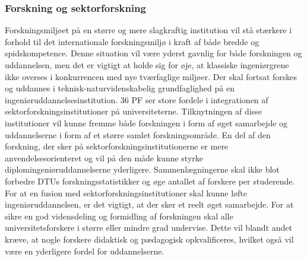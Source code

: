 \subsubsection{Forskning og sektorforskning}
Forskningsmiljøet på en større og mere slagkraftig institution vil stå stærkere i forhold til det internationale
forskningsmiljø i kraft af både bredde og spidskompetence. Denne situation vil være yderst gavnlig for både
forskningen og uddannelsen, men det er vigtigt at holde sig for øje, at klassiske ingeniørgrene ikke overses i
konkurrencen med nye tværfaglige miljøer. Der skal fortsat forskes og uddannes i teknisk-naturvidenskabelig
grundfaglighed på en ingeniøruddannelsesinstitution.
36
PF ser store fordele i integrationen af sektorforskningsinstitutioner på universiteterne. Tilknytningen af disse
institutioner vil kunne fremme både forskningen i form af øget samarbejde og uddannelserne i form af et større samlet
forskningsområde. En del af den forskning, der sker på sektorforskningsinstitutionerne er mere anvendelsesorienteret og
vil på den måde kunne styrke diplomingeniøruddannelserne yderligere.
Sammenlægningerne skal ikke blot forbedre DTUs forskningsstatistikker og øge antallet af forskere per studerende. For
at en fusion med sektorforskningsinstitutioner skal kunne løfte ingeniøruddannelsen, er det vigtigt, at der sker et reelt
øget samarbejde.
For at sikre en god vidensdeling og formidling af forskningen skal alle universitetsforskere i større eller mindre grad
undervise. Dette vil blandt andet kræve, at nogle forskere didaktisk og pædagogisk opkvalificeres, hvilket også vil være
en yderligere fordel for uddannelserne.
